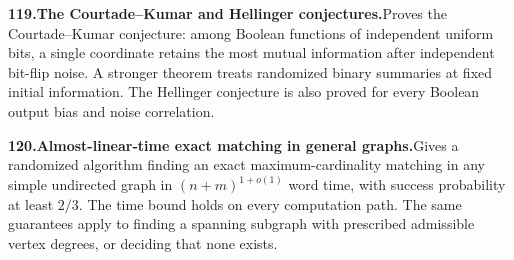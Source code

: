 \documentclass[11pt,a4paper]{article}
\begin{document}
  \par \begin{minipage}{\linewidth}
  \fontsize{10.5}{12.6}\selectfont\RaggedRight
  \hypertarget{result 119}{}
  {\bfseries\textcolor{muted}{119.}\enspace The Courtade--Kumar and Hellinger conjectures.}\enspace Proves the Courtade--Kumar conjecture: among Boolean functions of independent uniform bits, a single coordinate retains the most mutual information after independent bit-flip noise. A stronger theorem treats randomized binary summaries at fixed initial information. The Hellinger conjecture is also proved for every Boolean output bias and noise correlation.\par
  \end{minipage}\par\vspace{5pt}



  \par \begin{minipage}{\linewidth}
  \fontsize{10.5}{12.6}\selectfont\RaggedRight
  \hypertarget{result 120}{}
  {\bfseries\textcolor{muted}{120.}\enspace Almost-linear-time exact matching in general graphs.}\enspace Gives a randomized algorithm finding an exact maximum-cardinality matching in any simple undirected graph in $(n+m)^{1+o(1)}$ word time, with success probability at least $2/3$. The time bound holds on every computation path. The same guarantees apply to finding a spanning subgraph with prescribed admissible vertex degrees, or deciding that none exists.\par
  \end{minipage}\par\vspace{5pt}
\end{document}
